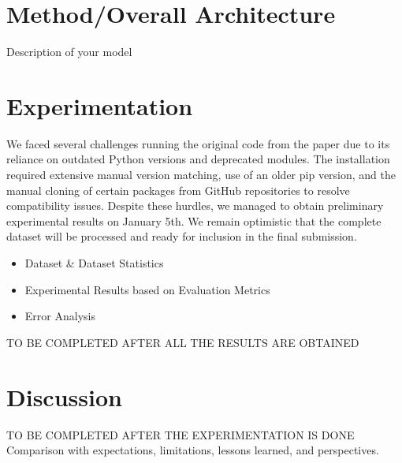 \documentclass[12pt,a4paper]{article}
\begin{document}
\section*{Method/Overall Architecture}

Description of your model

\section*{Experimentation}


We faced several challenges running the original code from the paper due to its reliance on outdated Python versions and deprecated modules. The installation required extensive manual version matching, use of an older pip version, and the manual cloning of certain packages from GitHub repositories to resolve compatibility issues. Despite these hurdles, we managed to obtain preliminary experimental results on January 5th. We remain optimistic that the complete dataset will be processed and ready for inclusion in the final submission.
\ \\
\begin{itemize}

\item Dataset \& Dataset Statistics
\item Experimental Results based on Evaluation Metrics
\item Error Analysis
\end{itemize}

TO BE COMPLETED AFTER ALL THE RESULTS ARE OBTAINED

\section*{Discussion}

TO BE COMPLETED AFTER THE EXPERIMENTATION IS DONE
\ \\

Comparison with expectations, limitations, lessons learned, and perspectives.


\end{document}
